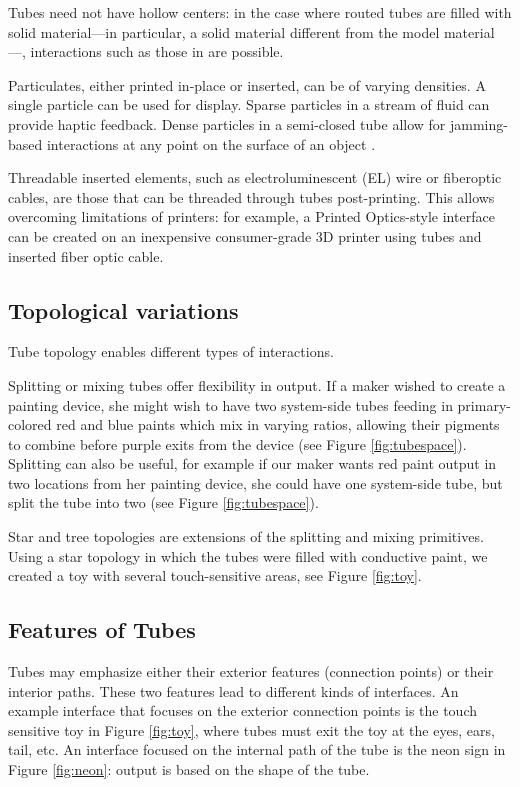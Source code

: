Tubes need not have hollow centers: in the case where routed tubes are filled with solid material---in particular, a solid material different from the model material---, interactions such as those in \cite{Willis-printedoptics} are possible.

Particulates, either printed in-place or inserted, can be of varying densities.  A single particle can be used for display.  Sparse particles in a stream of fluid can provide haptic feedback.  Dense particles in a semi-closed tube allow for jamming-based interactions at any point on the surface of an object \cite{Follmer-jamming}.

Threadable inserted elements, such as electroluminescent (EL) wire or fiberoptic cables, are those that can be threaded through tubes post-printing.  This allows overcoming limitations of printers: for example, a Printed Optics-style interface can be created on an inexpensive consumer-grade 3D printer using tubes and inserted fiber optic cable.

\subsection{Topological variations}

Tube topology enables different types of interactions.

Splitting or mixing tubes offer flexibility in output.  If a maker wished to create a painting device, she might wish to have two system-side tubes feeding in primary-colored red and blue paints which mix in varying ratios, allowing their pigments to combine before purple exits from the device (see Figure \ref{fig:tubespace}).  Splitting can also be useful, for example if our maker wants red paint output in two locations from her painting device, she could have one system-side tube, but split the tube into two (see Figure \ref{fig:tubespace}).

Star and tree topologies are extensions of the splitting and mixing primitives.  Using a star topology in which the tubes were filled with conductive paint, we created a toy with several touch-sensitive areas, see Figure \ref{fig:toy}.

\subsection{Features of Tubes}

Tubes may emphasize either their exterior features (connection points) or their interior paths.  These two features lead to different kinds of interfaces.  An example interface that focuses on the exterior connection points is the touch sensitive toy in Figure \ref{fig:toy}, where tubes must exit the toy at the eyes, ears, tail, etc.  An interface focused on the internal path of the tube is the neon sign in Figure \ref{fig:neon}: output is based on the shape of the tube.

